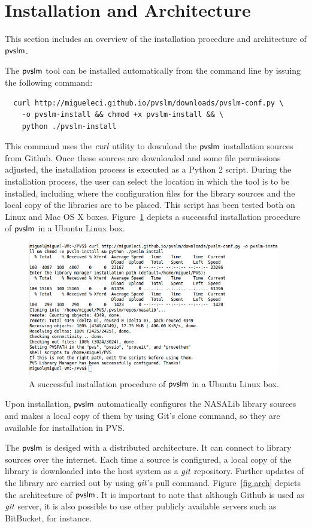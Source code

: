 \section{Installation and Architecture}
\label{sec.install}

This section includes an overview of the installation procedure
and architecture of $\textsf{pvslm}$.

The $\textsf{pvslm}$ tool can be installed automatically from the command line
by issuing the following command:
%
\begin{verbatim}
  curl http://migueleci.github.io/pvslm/downloads/pvslm-conf.py \
    -o pvslm-install && chmod +x pvslm-install && \
    python ./pvslm-install
\end{verbatim}
%
This command uses the $\textit{curl}$ utility to download the $\textsf{pvslm}$
installation sources from Github. Once these sources are downloaded
and some file permissions adjusted, the installation process is
executed as a Python 2 script. During the installation process, the
user can select the location in which the tool is to be installed,
including where the configuration files for the library sources and
the local copy of the libraries are to be placed. This script has been
tested both on Linux and Mac OS X boxes. Figure~\ref{fig.install}
depicts a successful installation procedure of $\textsf{pvslm}$ in a Ubuntu
Linux box.

\begin{figure}
  \centering
  \includegraphics[width=11cm]{images/install.png}
  \caption{A successful installation procedure of $\textsf{pvslm}$ in a Ubuntu
    Linux box.}
  \label{fig.install}
\end{figure}

Upon installation, $\textsf{pvslm}$ automatically configures the NASALib
library sources and makes a local copy of them by using Git's clone
command, so they are available for installation in PVS.

The $\textsf{pvslm}$ is desiged with a distributed architecture. It can
connect to library sources over the internet. Each time a source is
configured, a local copy of the library is downloaded into the host
system as a $\textit{git}$ repository. Further updates of the library are
carried out by using $\textit{git}$'s pull command. Figure~\ref{fig.arch}
depicts the architecture of $\textsf{pvslm}$. It is important to note that
although Github is used as $\textit{git}$ server, it is also possible to use
other publicly available servers such as BitBucket, for instance.

